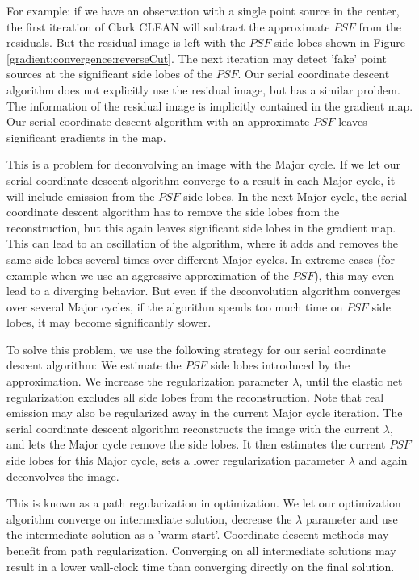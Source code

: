 For example: if we have an observation with a single point source in the center, the first iteration of Clark CLEAN will subtract the approximate $PSF$ from the residuals. But the residual image is left with the $PSF$ side lobes shown in Figure \ref{gradient:convergence:reverseCut}. The next iteration may detect 'fake' point sources at the significant side lobes of the $PSF$. Our serial coordinate descent algorithm does not explicitly use the residual image, but has a similar problem. The information of the residual image is implicitly contained in the gradient map. Our serial coordinate descent algorithm with an approximate $PSF$ leaves significant gradients in the map.

This is a problem for deconvolving an image with the Major cycle. If we let our serial coordinate descent algorithm converge to a result in each Major cycle, it will include emission from the $PSF$ side lobes. In the next Major cycle, the serial coordinate descent algorithm has to remove the side lobes from the reconstruction, but this again leaves significant side lobes in the gradient map. This can lead to an oscillation of the algorithm, where it adds and removes the same side lobes several times over different Major cycles. In extreme cases (for example when we use an aggressive approximation of the $PSF$), this may even lead to a diverging behavior. But even if the deconvolution algorithm converges over several Major cycles, if the algorithm spends too much time on $PSF$ side lobes, it may become significantly slower.

To solve this problem, we use the following strategy for our serial coordinate descent algorithm: We estimate the $PSF$ side lobes introduced by the approximation. We increase the regularization parameter $\lambda$, until the elastic net regularization excludes all side lobes from the reconstruction. Note that real emission may also be regularized away in the current Major cycle iteration. The serial coordinate descent algorithm reconstructs the image with the current $\lambda$, and lets the Major cycle remove the side lobes. It then estimates the current $PSF$ side lobes for this Major cycle, sets a lower regularization parameter $\lambda$ and again deconvolves the image.

This is known as a path regularization in optimization. We let our optimization algorithm converge on intermediate solution, decrease the $\lambda$ parameter and use the intermediate solution as a 'warm start'. Coordinate descent methods may benefit from path regularization\cite{friedman2010regularization}. Converging on all intermediate solutions may result in a lower wall-clock time than converging directly on the final solution.

